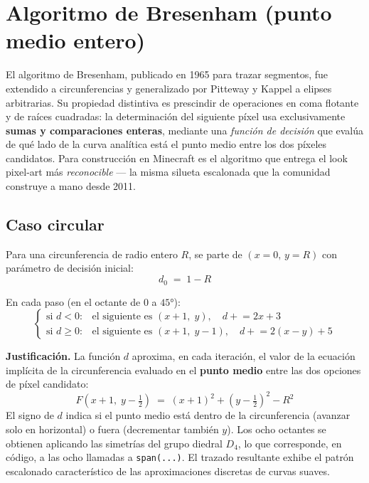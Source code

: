 \documentclass[12pt,a4paper]{scrartcl}
\newcommand{\code}[1]{\texttt{\small #1}}
\newcommand{\acc}[1]{\textcolor{accent}{\textbf{#1}}}
\begin{document}
\section{Algoritmo de Bresenham (punto medio entero)}

El algoritmo de Bresenham, publicado en 1965 para trazar segmentos, fue extendido a circunferencias y generalizado por Pitteway y Kappel a elipses arbitrarias. Su propiedad distintiva es prescindir de operaciones en coma flotante y de raíces cuadradas: la determinación del siguiente píxel usa exclusivamente \acc{sumas y comparaciones enteras}, mediante una \emph{función de decisión} que evalúa de qué lado de la curva analítica está el punto medio entre los dos píxeles candidatos. Para construcción en Minecraft es el algoritmo que entrega el look pixel-art más \emph{reconocible} --- la misma silueta escalonada que la comunidad construye a mano desde 2011.

\subsection{Caso circular}

Para una circunferencia de radio entero $R$, se parte de $(x{=}0,\,y{=}R)$ con parámetro de decisión inicial:
\[
d_0 \;=\; 1 - R
\]

En cada paso (en el octante de $0$ a $45°$):
\[
\begin{cases}
\text{si } d < 0: & \text{el siguiente es } (x{+}1,\;y), \quad d \mathrel{+}= 2x+3 \\[2pt]
\text{si } d \geq 0: & \text{el siguiente es } (x{+}1,\;y{-}1), \quad d \mathrel{+}= 2(x-y)+5
\end{cases}
\]

\textbf{Justificación.} La función $d$ aproxima, en cada iteración, el valor de la ecuación implícita de la circunferencia evaluado en el \acc{punto medio} entre las dos opciones de píxel candidato:
\[
F\!\left(x+1,\;y-\tfrac{1}{2}\right) \;=\; (x+1)^2 + \left(y-\tfrac{1}{2}\right)^{\!2} - R^2
\]
El signo de $d$ indica si el punto medio está dentro de la circunferencia (avanzar solo en horizontal) o fuera (decrementar también $y$). Los ocho octantes se obtienen aplicando las simetrías del grupo diedral $D_4$, lo que corresponde, en código, a las ocho llamadas a \code{span(...)}. El trazado resultante exhibe el patrón escalonado característico de las aproximaciones discretas de curvas suaves.
\end{document}
